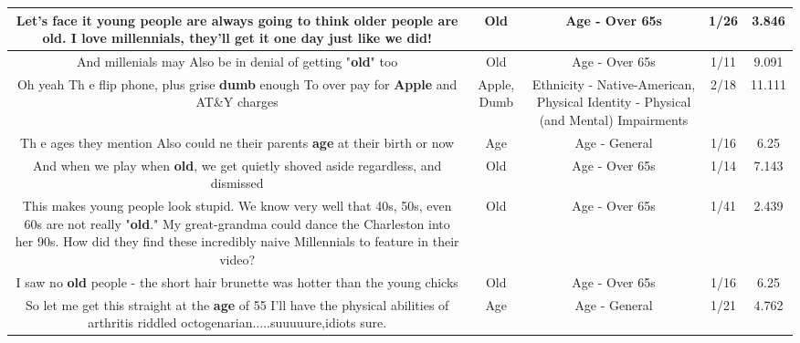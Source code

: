 \documentclass[11pt]{article}
\newlength\mylength
\begin{document}
\begin{center}
\begin{longtable}{|C{.65\mylength}|C{.30\mylength}|C{.12\mylength}|C{.12\mylength}|C{.12\mylength}|}
  \small Let's face it young people are always going to think older people are \textbf{old}. I love millennials, they'll get it one day just like we did!\normalsize   & Old & Age - Over 65s & 1/26 & 3.846 \\  \hline
  \small And millenials may  Also be in denial of  getting  "\textbf{old}" too\normalsize   & Old & Age - Over 65s & 1/11 & 9.091 \\  \hline
  \small Oh yeah Th e flip phone, plus grise \textbf{dumb} enough To over pay for \textbf{Apple} and AT\&Y charges\normalsize   & Apple, Dumb & Ethnicity - Native-American, Physical Identity - Physical (and Mental) Impairments & 2/18 & 11.111 \\  \hline
  \small Th e ages they mention Also could ne their parents \textbf{age} at their birth or now\normalsize   & Age & Age - General & 1/16 & 6.25 \\  \hline
  \small And when we play when \textbf{old}, we get quietly shoved aside regardless, and dismissed\normalsize   & Old & Age - Over 65s & 1/14 & 7.143 \\  \hline
  \small This makes young people look stupid. We know very well that 40s, 50s, even 60s are not really "\textbf{old}." My great-grandma could dance the Charleston into her 90s. How did they find these incredibly naive Millennials to feature in their video?\normalsize   & Old & Age - Over 65s & 1/41 & 2.439 \\  \hline
  \small I saw no \textbf{old} people - the short hair brunette was hotter than the young chicks\normalsize   & Old & Age - Over 65s & 1/16 & 6.25 \\  \hline
  \small So let me get this straight at the \textbf{age} of 55 I'll have the physical abilities of arthritis riddled octogenarian.....suuuuure,idiots sure.\normalsize   & Age & Age - General & 1/21 & 4.762 \\  \hline

\end{longtable}
\end{center}
\end{document}

